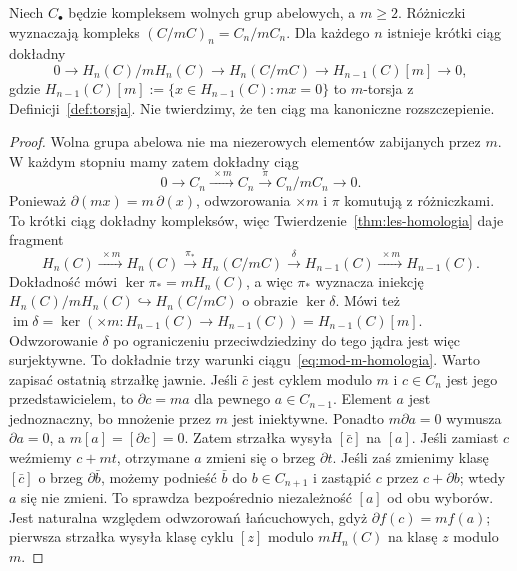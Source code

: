 \begin{twierdzenie}
\label{thm:mod-m-homologia}
Niech $C_\bullet$ będzie kompleksem
wolnych grup abelowych, a $m\geq2$.
Różniczki wyznaczają kompleks
$(C/mC)_n=C_n/mC_n$. Dla każdego
$n$ istnieje krótki ciąg dokładny
\begin{equation}\label{eq:mod-m-homologia}
 0\longrightarrow H_n(C)/mH_n(C)
 \longrightarrow H_n(C/mC)
 \longrightarrow H_{n-1}(C)[m]
 \longrightarrow0,
\end{equation}
gdzie $H_{n-1}(C)[m]:=
\{x\in H_{n-1}(C):mx=0\}$
to $m$-torsja z Definicji~\ref{def:torsja}.
Nie twierdzimy, że ten ciąg ma
kanoniczne rozszczepienie.
\end{twierdzenie}
\begin{proof}
Wolna grupa abelowa nie ma
niezerowych elementów zabijanych
przez $m$. W każdym stopniu mamy
zatem dokładny ciąg
\[
 0\to C_n\xrightarrow{\ \times m\ }C_n
 \xrightarrow{\ \pi\ }C_n/mC_n\to0.
\]
Ponieważ $\partial(mx)=m\,\partial(x)$,
odwzorowania $\times m$ i $\pi$
komutują z różniczkami.
To krótki ciąg dokładny
kompleksów, więc
Twierdzenie~\ref{thm:les-homologia}
daje fragment
\[
 H_n(C)\xrightarrow{\ \times m\ }H_n(C)
 \xrightarrow{\ \pi_*\ }H_n(C/mC)
 \xrightarrow{\ \delta\ }H_{n-1}(C)
 \xrightarrow{\ \times m\ }H_{n-1}(C).
\]
Dokładność mówi
$\ker\pi_*=mH_n(C)$, a więc
$\pi_*$ wyznacza iniekcję
$H_n(C)/mH_n(C)\hookrightarrow H_n(C/mC)$
o obrazie $\ker\delta$.
Mówi też
$\operatorname{im}\delta
=\ker(\times m:H_{n-1}(C)\to H_{n-1}(C))
=H_{n-1}(C)[m]$.
Odwzorowanie $\delta$ po ograniczeniu
przeciwdziedziny do tego jądra
jest więc surjektywne.
To dokładnie trzy warunki
ciągu~\eqref{eq:mod-m-homologia}.
Warto zapisać ostatnią strzałkę jawnie. Jeśli $\bar c$ jest cyklem
modulo $m$ i $c\in C_n$ jest jego przedstawicielem, to
$\partial c=ma$ dla pewnego $a\in C_{n-1}$.
Element $a$ jest jednoznaczny, bo mnożenie przez $m$ jest iniektywne.
Ponadto $m\partial a=0$ wymusza $\partial a=0$,
a $m[a]=[\partial c]=0$. Zatem strzałka wysyła $[\bar c]$ na $[a]$.
Jeśli zamiast $c$ weźmiemy $c+mt$, otrzymane $a$ zmieni się
o brzeg $\partial t$. Jeśli zaś zmienimy klasę $[\bar c]$
o brzeg $\partial\bar b$, możemy podnieść $\bar b$ do $b\in C_{n+1}$
i zastąpić $c$ przez $c+\partial b$; wtedy $a$ się nie zmieni.
To sprawdza bezpośrednio niezależność $[a]$ od obu wyborów.
Jest naturalna względem odwzorowań łańcuchowych, gdyż
$\partial f(c)=mf(a)$; pierwsza strzałka wysyła klasę cyklu
$[z]$ modulo $mH_n(C)$ na klasę $z$ modulo $m$.
\end{proof}

